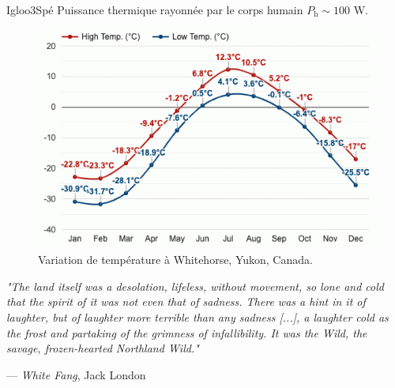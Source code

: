 \begin{exercise}{Igloo}{3}{Spé}
Puissance thermique rayonnée par le corps humain $P_\text{h} \sim 100$ W.

\begin{figure}[H]
    \centering
    \includegraphics[scale=1.3]{thermo/diffusion/diffusionthermique/igloo.png}
    \caption{Variation de température à Whitehorse, Yukon, Canada.}
\end{figure}

\bigskip

\begin{center}
    \begin{minipage}{15cm}
        \textit{
        "The land itself was a desolation, lifeless, without movement, so lone and cold that the spirit of it was not even that of sadness. There was a hint in it of laughter, but of laughter more terrible than any sadness [...], a laughter cold as the frost and partaking of the grimness of infallibility. It was the Wild, the savage, frozen-hearted Northland Wild."}
        
        --- \quad \emph{White Fang}, Jack London
    \end{minipage}
\end{center}


\end{exercise}

